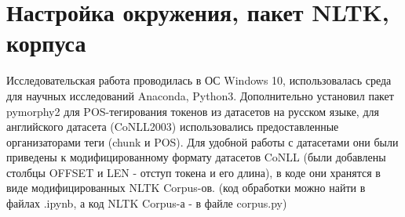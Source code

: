 \section{Настройка окружения, пакет NLTK, корпуса}


Исследовательская работа проводилась в ОС Windows 10, использовалась среда для научных исследований Anaconda, Python3. Дополнительно установил пакет pymorphy2 для POS-тегирования токенов из датасетов на русском языке, для английского датасета (CoNLL2003) использовались предоставленные организаторами теги (chunk и POS). Для удобной работы с датасетами они были приведены к модифицированному формату датасетов CoNLL (были добавлены столбцы OFFSET и LEN - отступ токена и его длина), в коде они хранятся в виде модифицированных NLTK Corpus-ов. (код обработки можно найти в файлах .ipynb, а код NLTK Corpus-а - в файле corpus.py)